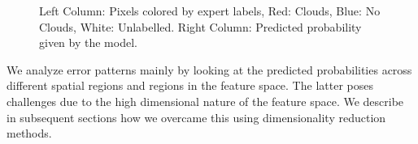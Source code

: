 \documentclass[11pt, letterpaper, journal]{IEEEtran}
\begin{document}
\begin{figure}
    \centering
    \qquad
    \qquad
    \caption{Left Column: Pixels colored by expert labels, Red: Clouds, Blue: No Clouds, White: Unlabelled. Right Column: Predicted probability given by the model.}
    \label{fig:Probability_Preds}
\end{figure}


We analyze error patterns mainly by looking at the predicted probabilities across different spatial regions and regions in the feature space. The latter poses challenges due to the high dimensional nature of the feature space. We describe in subsequent sections how we overcame this using dimensionality reduction methods.
\end{document}
